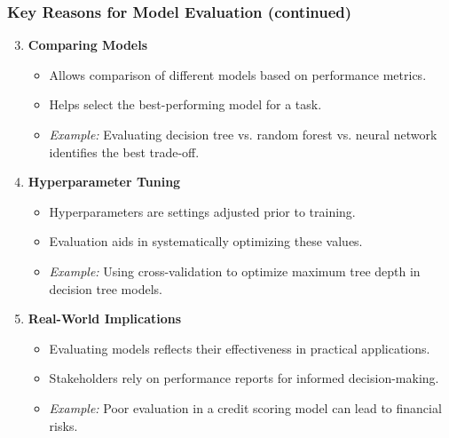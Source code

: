 \documentclass[aspectratio=169]{beamer}
\begin{document}
\begin{frame}[fragile]
    \frametitle{Key Reasons for Model Evaluation (continued)}
    \begin{enumerate}
        \setcounter{enumi}{2} %
        \item \textbf{Comparing Models}
            \begin{itemize}
                \item Allows comparison of different models based on performance metrics.
                \item Helps select the best-performing model for a task.
                \item \textit{Example:} Evaluating decision tree vs. random forest vs. neural network identifies the best trade-off.
            \end{itemize}

        \item \textbf{Hyperparameter Tuning}
            \begin{itemize}
                \item Hyperparameters are settings adjusted prior to training.
                \item Evaluation aids in systematically optimizing these values.
                \item \textit{Example:} Using cross-validation to optimize maximum tree depth in decision tree models.
            \end{itemize}

        \item \textbf{Real-World Implications}
            \begin{itemize}
                \item Evaluating models reflects their effectiveness in practical applications.
                \item Stakeholders rely on performance reports for informed decision-making.
                \item \textit{Example:} Poor evaluation in a credit scoring model can lead to financial risks.
            \end{itemize}
    \end{enumerate}
\end{frame}
\end{document}
